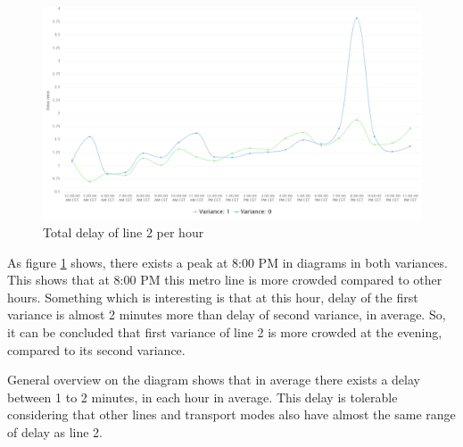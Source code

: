 \documentclass{article}
\begin{document}
 \begin{figure}[H]
    \centering
    \includegraphics[width=\textwidth]{images/delay_2.png} 
    \caption{Total delay of line 2 per hour}
    \label{fig:delay_2}
\end{figure}
As figure \ref{fig:delay_2} shows, there exists a peak at 8:00 PM in diagrams in both variances. This shows that at 8:00 PM this metro line is more crowded compared to other hours. Something which is interesting is that at this hour, delay of the first variance is almost 2 minutes more than delay of second variance, in average. So, it can be concluded that first variance of line 2 is more crowded at the evening, compared to its second variance. 

General overview on the diagram shows that in average there exists a delay between 1 to 2 minutes, in each hour in average. This delay is tolerable considering that other lines and transport modes also have almost the same range of delay as line 2.
\end{document}

